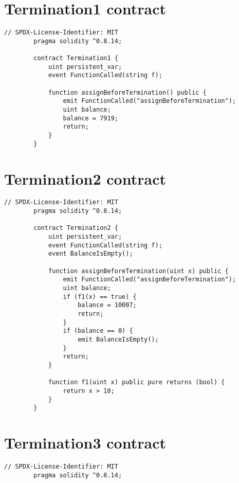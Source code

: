 \documentclass[12pt]{report}
\begin{document}
    \begin{appendices}
    \chapter{Termination1 contract}
    \begin{lstlisting}[language=Solidity]
        // SPDX-License-Identifier: MIT
        pragma solidity ^0.8.14;
        
        contract Termination1 {
            uint persistent_var;
            event FunctionCalled(string f);
        
            function assignBeforeTermination() public {
                emit FunctionCalled("assignBeforeTermination");
                uint balance;
                balance = 7919;
                return;
            }
        }            
    \end{lstlisting}

    \chapter{Termination2 contract}
    \begin{lstlisting}[language=Solidity]
        // SPDX-License-Identifier: MIT
        pragma solidity ^0.8.14;
        
        contract Termination2 {
            uint persistent_var;
            event FunctionCalled(string f);
            event BalanceIsEmpty();
        
            function assignBeforeTermination(uint x) public {
                emit FunctionCalled("assignBeforeTermination");
                uint balance;
                if (f1(x) == true) {
                    balance = 10007;
                    return;
                }
                if (balance == 0) {
                    emit BalanceIsEmpty();
                }
                return;
            }
        
            function f1(uint x) public pure returns (bool) {
                return x > 10;
            }
        }                    
    \end{lstlisting}

    \chapter{Termination3 contract}
    \begin{lstlisting}[language=Solidity]
        // SPDX-License-Identifier: MIT
        pragma solidity ^0.8.14;


\end{lstlisting}
\end{appendices}
\end{document}

